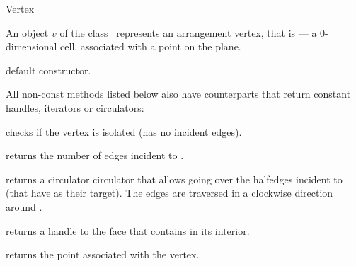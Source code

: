 
\ccRefPageBegin

\begin{ccRefClass}{Vertex}

\ccDefinition
An object $v$ of the class \ccRefName\ represents an arrangement vertex,
that is --- a $0$-dimensional cell, associated with a point on the plane. 

\ccInheritsFrom

\ccCreation
{}

    {default constructor.}    

\ccAccessFunctions

All non-const methods listed below also have  counterparts
that return constant handles, iterators or circulators:

    {checks if the vertex is isolated (has no incident edges).}

    {returns the number of edges incident to \ccVar{}.}

    {returns a circulator circulator that allows going over the halfedges
     incident to \ccVar{} (that have \ccVar{} as their target).
     The edges are traversed in a clockwise direction around \ccVar{}.
     }

    {returns a handle to the face that contains \ccVar{} in its interior.
     }

    {returns the point associated with the vertex.}

\end{ccRefClass}

\ccRefPageEnd
